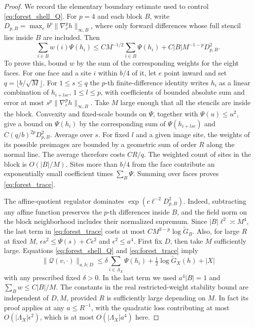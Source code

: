 \documentclass[11pt]{article}
\begin{document}
\begin{proof}
We record the elementary boundary estimate used to control
\eqref{eq:forest_shell_Q}. For \(p=4\) and each block \(B\), write
\(D_{p,B}=\max_e b^p\|\nabla_e^p h\|_{\infty,B}\), where only
forward differences whose full stencil lies inside \(B\) are
included. Then
\begin{equation}\label{eq:forest_trace}
 \sum_{i\in B}w(i)\Psi(h_i)
 \le C M^{-1/2}\sum_{i\in B}\Psi(h_i)
       +C|B|M^{-1-p}D_{p,B}^2 .
\end{equation}
To prove this, bound \(w\) by the sum of the corresponding weights
for the eight faces. For one face and a site \(i\) within \(b/4\)
of it, let \(e\) point inward and set \(q=\lfloor b/\sqrt M\rfloor\).
For \(1\le s\le q\) the \(p\)-th finite-difference identity writes
\(h_i\) as a linear combination of \(h_{i+lse}\), \(1\le l\le p\),
with coefficients of bounded absolute sum and error at most
\(s^p\|\nabla_e^p h\|_{\infty,B}\). Take \(M\) large enough that
all the stencils are inside the block. Convexity and fixed-scale
bounds on \(\Psi\), together with \(\Psi(u)\le u^2\), give a bound
on \(\Psi(h_i)\) by the corresponding sum of \(\Psi(h_{i+lse})\)
and \(C(q/b)^{2p}D_{p,B}^2\). Average over \(s\).
For fixed \(l\) and a given image site, the weights of its
possible preimages are bounded by a geometric sum of order \(R\)
along the normal line. The average therefore costs \(CR/q\).
The weighted count of sites in the block is \(O(|B|/M)\).
Sites more than \(b/4\) from the face contribute an
exponentially small coefficient times \(\sum_B\Psi\).
Summing over faces proves \eqref{eq:forest_trace}.

The affine-quotient regulator dominates
\(\exp(c\ell^{-2}D_{p,B}^2)\). Indeed, subtracting any affine
function preserves the \(p\)-th differences inside \(B\),
and the field norm on the block neighborhood includes their
normalized supremum. Since \(|B|\ell^2\asymp M^4\), the last
term in \eqref{eq:forest_trace} costs at most
\(CM^{3-p}\log\widetilde G_B\). Also, for large \(R\) at fixed
\(M\), \(\epsilon s^2\le\Psi(s)+C\epsilon^2\) and
\(\epsilon^2\le a^4\). First fix \(D\), then take \(M\)
sufficiently large. Equations \eqref{eq:forest_shell_Q} and
\eqref{eq:forest_trace} imply
\[
 \|\mathcal Q(v,\cdot)\|_{a,h;D}
 \le \delta\sum_{i\in\Lambda_X}\Psi(h_i)
       +\tfrac12\log\widetilde G_X(h)+|X|
\]
with any prescribed fixed \(\delta>0\). In the last term we used
\(a^4|B|=1\) and \(\sum_B w\le C|B|/M\). The constants in the
real restricted-weight stability bound are independent of
\(D,M\), provided \(R\) is sufficiently large depending on \(M\).
In fact its proof applies at any \(a\le R^{-1}\), with the
quadratic loss contributing at most \(O(|\Lambda_X|\epsilon^2)\),
which is at most \(O(|\Lambda_X|a^4)\) here.


\end{proof}
\end{document}
